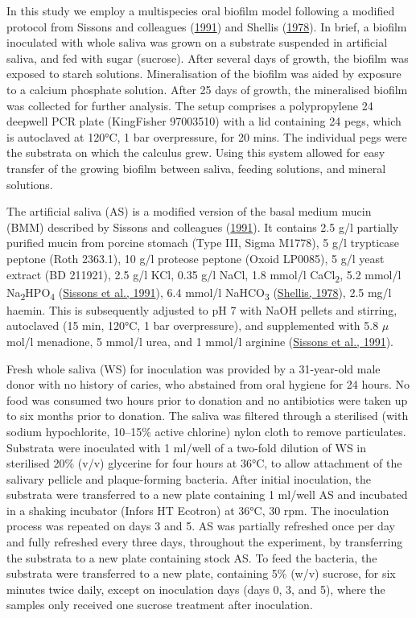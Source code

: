 \documentclass[
  letterpaper,
]{book}
\begin{document}
In this study we employ a multispecies oral biofilm model following a
modified protocol from Sissons and colleagues
(\protect\hyperlink{ref-sissonsMultistationPlaque1991}{1991}) and
Shellis (\protect\hyperlink{ref-shellisSyntheticSaliva1978}{1978}). In
brief, a biofilm inoculated with whole saliva was grown on a substrate
suspended in artificial saliva, and fed with sugar (sucrose). After
several days of growth, the biofilm was exposed to starch solutions.
Mineralisation of the biofilm was aided by exposure to a calcium
phosphate solution. After 25 days of growth, the mineralised biofilm was
collected for further analysis. The setup comprises a polypropylene 24
deepwell PCR plate (KingFisher 97003510) with a lid containing 24 pegs,
which is autoclaved at 120°C, 1 bar overpressure, for 20 mins. The
individual pegs were the substrata on which the calculus grew. Using
this system allowed for easy transfer of the growing biofilm between
saliva, feeding solutions, and mineral solutions.

The artificial saliva (AS) is a modified version of the basal medium
mucin (BMM) described by Sissons and colleagues
(\protect\hyperlink{ref-sissonsMultistationPlaque1991}{1991}). It
contains 2.5 g/l partially purified mucin from porcine stomach (Type
III, Sigma M1778), 5 g/l trypticase peptone (Roth 2363.1), 10 g/l
proteose peptone (Oxoid LP0085), 5 g/l yeast extract (BD 211921), 2.5
g/l KCl, 0.35 g/l NaCl, 1.8 mmol/l CaCl\textsubscript{2}, 5.2 mmol/l
Na\textsubscript{2}HPO\textsubscript{4}
(\protect\hyperlink{ref-sissonsMultistationPlaque1991}{Sissons et al.,
1991}), 6.4 mmol/l NaHCO\textsubscript{3}
(\protect\hyperlink{ref-shellisSyntheticSaliva1978}{Shellis, 1978}), 2.5
mg/l haemin. This is subsequently adjusted to pH 7 with NaOH pellets and
stirring, autoclaved (15 min, 120°C, 1 bar overpressure), and
supplemented with 5.8 \(\mu\)mol/l menadione, 5 mmol/l urea, and 1
mmol/l arginine
(\protect\hyperlink{ref-sissonsMultistationPlaque1991}{Sissons et al.,
1991}).

Fresh whole saliva (WS) for inoculation was provided by a 31-year-old
male donor with no history of caries, who abstained from oral hygiene
for 24 hours. No food was consumed two hours prior to donation and no
antibiotics were taken up to six months prior to donation. The saliva
was filtered through a sterilised (with sodium hypochlorite, 10--15\%
active chlorine) nylon cloth to remove particulates. Substrata were
inoculated with 1 ml/well of a two-fold dilution of WS in sterilised
20\% (v/v) glycerine for four hours at 36°C, to allow attachment of the
salivary pellicle and plaque-forming bacteria. After initial
inoculation, the substrata were transferred to a new plate containing 1
ml/well AS and incubated in a shaking incubator (Infors HT Ecotron) at
36°C, 30 rpm. The inoculation process was repeated on days 3 and 5. AS
was partially refreshed once per day and fully refreshed every three
days, throughout the experiment, by transferring the substrata to a new
plate containing stock AS. To feed the bacteria, the substrata were
transferred to a new plate, containing 5\% (w/v) sucrose, for six
minutes twice daily, except on inoculation days (days 0, 3, and 5),
where the samples only received one sucrose treatment after inoculation.
\end{document}
